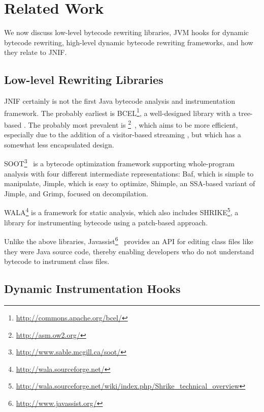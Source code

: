 \section{Related Work}\label{sec:jnif-relatedwork}

We now discuss low-level \java{} bytecode rewriting libraries,
JVM hooks for dynamic bytecode rewriting,
high-level dynamic bytecode rewriting frameworks,
and how they relate to JNIF.
 
\subsection*{Low-level Rewriting Libraries}

JNIF certainly is not the first Java bytecode analysis and instrumentation framework.
The probably earliest is BCEL\footnote{\url{http://commons.apache.org/bcel/}},
a well-designed \java{} library with a tree-based \api{}.
The probably most prevalent is \asm{}\footnote{\url{http://asm.ow2.org/}}~\citep{brunetonASMCodeManipulation2002,kuleshovUsingASMFramework2007},
which aims to be more efficient, especially due to the addition of a visitor-based streaming \api{}, 
but which has a somewhat less encapsulated design.

SOOT\footnote{\url{http://www.sable.mcgill.ca/soot/}}~\citep{vallee-raiSootJavaBytecode1999}
is a \java{} bytecode optimization framework supporting whole-program analysis
with four different intermediate representations:
Baf, which is simple to manipulate,
Jimple, which is easy to optimize, 
Shimple, an SSA-based variant of Jimple, and
Grimp, focused on decompilation. 

WALA\footnote{\url{http://wala.sourceforge.net/}} is a framework for static analysis, 
which also includes SHRIKE\footnote{\url{http://wala.sourceforge.net/wiki/index.php/Shrike_technical_overview}}, 
a library for instrumenting bytecode using a patch-based approach.

Unlike the above libraries, 
Javassist\footnote{\url{http://www.javassist.org/}}~\citep{chibaEasytoUseToolkitEfficient2003}
provides an API for editing class files like they were Java source code,
thereby enabling developers who do not understand bytecode to instrument class files.

\subsection*{Dynamic Instrumentation Hooks}

